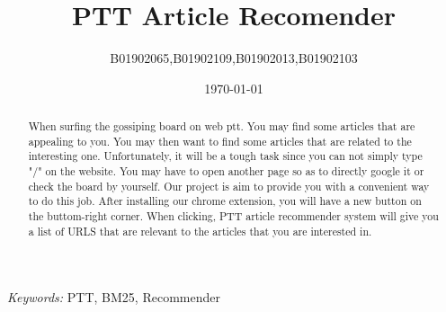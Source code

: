 \documentclass[a4paper, 10pt,twocolumn]{article} %
\title{\textbf{\Large PTT Article Recomender}\\ %
} %
\author{B01902065,B01902109,B01902013,B01902103} %
\date{\today} %
\makeatletter
\renewcommand{\maketitle}{\bgroup\setlength{\parindent}{0pt}
\begin{flushleft}
  \textbf{\@title}

  \@author
\end{flushleft}\egroup
}
\makeatother
\begin{document}
\maketitle %


\begin{abstract}
When surfing the gossiping board on web ptt. You may find some articles that are appealing to you.  You may then want to find some articles that are related to the interesting one. Unfortunately, it will be a tough task since you can not simply type "/"  on the website. You may have to open another page so as to directly google it or  check the board by yourself. Our project is aim to provide you with a convenient way to do this job. After installing our chrome extension, you will have a new button on the buttom-right corner. When clicking, PTT article recommender system will give you a list of URLS that are relevant to the articles that you are interested in.
\end{abstract}

\hspace*{5,6mm}\textit{Keywords:} PTT, BM25, Recommender %

\end{document}
